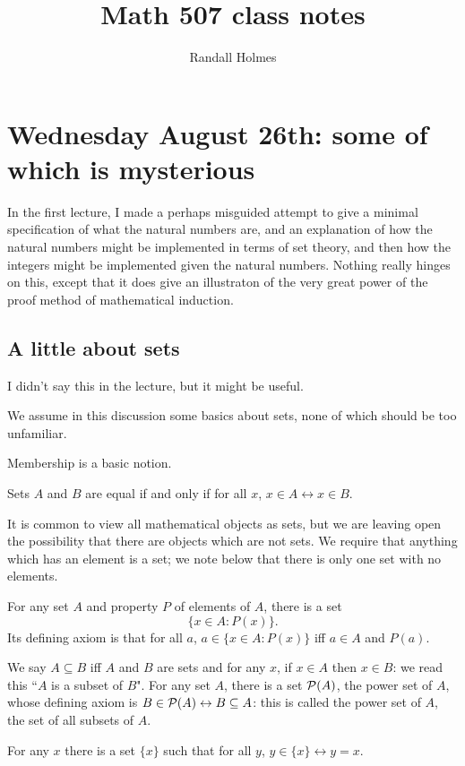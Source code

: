 \documentclass[12pt]{article}
\title{Math 507 class notes}
\author{Randall Holmes}
\begin{document}
\maketitle

\section{Wednesday August 26th:  some of which is mysterious}


In the first lecture, I made a perhaps misguided attempt to give a minimal specification of what the natural numbers are, and an explanation of how the natural numbers might be implemented in terms of set theory, and then how the integers might be implemented given the natural numbers.  Nothing really hinges on this, except that it does give an illustraton of the very great power of the proof method of mathematical induction.

\subsection{A little about sets}

I didn't say this in the lecture, but it might be useful.

We assume in this discussion some basics about sets, none of which should be too unfamiliar.  

Membership is a basic notion.  

Sets $A$ and $B$ are equal if and only if for all $x$, $x \in A \leftrightarrow x \in B$. 

It is common to view all mathematical objects as sets, but we are leaving open the possibility that there are objects which are not sets.  We require that anything which has an element is a set;  we note below that there is only one set with no elements.

For any set $A$ and property $P$ of elements of $A$, there is a set $$\{x \in A:P(x)\}.$$  Its defining axiom is that for all $a$, $a \in \{x \in A:P(x)\}$ iff $a \in A$ and $P(a)$.

We say $A \subseteq B$ iff $A$ and $B$ are sets and for any $x$, if $x \in A$ then $x \in B$:  we read this ``$A$ is a subset of $B$".  For any set $A$, there is a set ${\cal P}(A)$, the power set of $A$,
whose defining axiom is $B \in {\cal P}(A) \leftrightarrow B \subseteq A$:  this is called the power set of $A$, the set of all subsets of $A$.

  For any $x$ there is a set $\{x\}$ such that for all $y$, $y \in \{x\} \leftrightarrow y = x$.   
\end{document}

